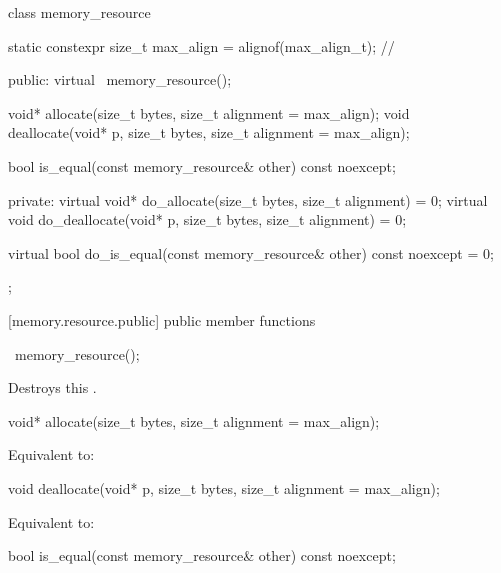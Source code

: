 %
\begin{codeblock}
class memory_resource {
  static constexpr size_t max_align = alignof(max_align_t); // \expos

public:
  virtual ~memory_resource();

  void* allocate(size_t bytes, size_t alignment = max_align);
  void deallocate(void* p, size_t bytes, size_t alignment = max_align);

  bool is_equal(const memory_resource& other) const noexcept;

private:
  virtual void* do_allocate(size_t bytes, size_t alignment) = 0;
  virtual void do_deallocate(void* p, size_t bytes, size_t alignment) = 0;

  virtual bool do_is_equal(const memory_resource& other) const noexcept = 0;
};
\end{codeblock}


[memory.resource.public]{ public member functions}

%
\begin{itemdecl}
~memory_resource();
\end{itemdecl}

\begin{itemdescr}
\pnum
\effects
Destroys this .
\end{itemdescr}

%
\begin{itemdecl}
void* allocate(size_t bytes, size_t alignment = max_align);
\end{itemdecl}

\begin{itemdescr}
\pnum
\effects
Equivalent to: 
\end{itemdescr}

%
\begin{itemdecl}
void deallocate(void* p, size_t bytes, size_t alignment = max_align);
\end{itemdecl}

\begin{itemdescr}
\pnum
\effects
Equivalent to: 
\end{itemdescr}

%
\begin{itemdecl}
bool is_equal(const memory_resource& other) const noexcept;
\end{itemdecl}

